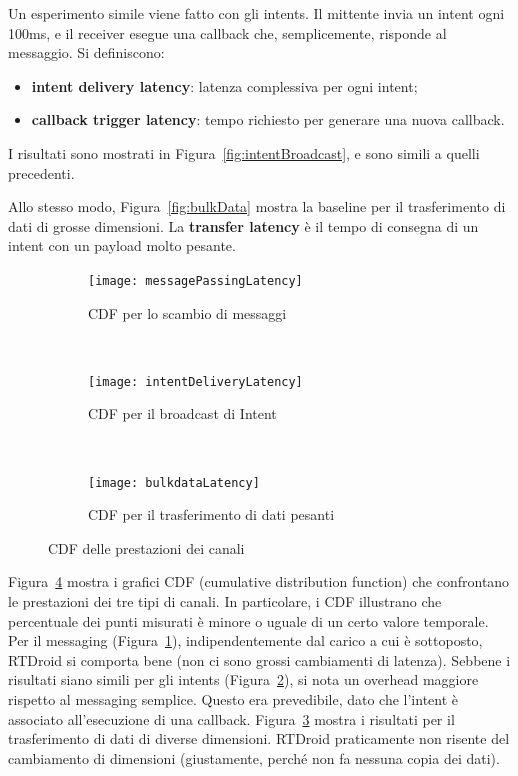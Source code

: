Un esperimento simile viene fatto con gli intents. Il mittente invia un intent ogni 100ms, e il receiver esegue una callback che, semplicemente, risponde al messaggio. Si definiscono:
\begin{itemize}
	\item \textbf{intent delivery latency}: latenza complessiva per ogni intent;
	\item \textbf{callback trigger latency}: tempo richiesto per generare una nuova callback.
\end{itemize}
I risultati sono mostrati in Figura~\ref{fig:intentBroadcast}, e sono simili a quelli precedenti.

Allo stesso modo, Figura~\ref{fig:bulkData} mostra la baseline per il trasferimento di dati di grosse dimensioni. La \textbf{transfer latency} è il tempo di consegna di un intent con un payload molto pesante.

\begin{figure}[h]
	\centering
	\begin{subfigure}[b]{0.3\textwidth}
		\texttt{[image: messagePassingLatency]}
		\caption{CDF per lo scambio di messaggi}
		\label{fig:messagePassingLatency}
	\end{subfigure}
	~ 
	\begin{subfigure}[b]{0.3\textwidth}
		\texttt{[image: intentDeliveryLatency]}
		\caption{CDF per il broadcast di Intent}
		\label{fig:intentDeliveryLatency}
	\end{subfigure}
	~
	\begin{subfigure}[b]{0.3\textwidth}
		\texttt{[image: bulkdataLatency]}
		\caption{CDF per il trasferimento di dati pesanti}
		\label{fig:bulkdatalatency}
	\end{subfigure}
	\caption{CDF delle prestazioni dei canali}\label{fig:cdfchannels}
\end{figure}

Figura~\ref{fig:cdfchannels} mostra i grafici CDF (cumulative distribution function) che confrontano le prestazioni dei tre tipi di canali. In particolare, i CDF illustrano che percentuale dei punti misurati è minore o uguale di un certo valore temporale. Per il messaging (Figura~\ref{fig:messagePassingLatency}), indipendentemente dal carico a cui è sottoposto, RTDroid si comporta bene (non ci sono grossi cambiamenti di latenza). Sebbene i risultati siano simili per gli intents (Figura~\ref{fig:intentDeliveryLatency}), si nota un overhead maggiore rispetto al messaging semplice. Questo era prevedibile, dato che l'intent è associato all'esecuzione di una callback. Figura~\ref{fig:bulkdatalatency} mostra i risultati per il trasferimento di dati di diverse dimensioni. RTDroid praticamente non risente del cambiamento di dimensioni (giustamente, perché non fa nessuna copia dei dati).

